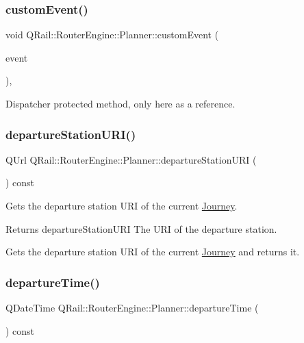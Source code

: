\subsubsection{\texorpdfstring{customEvent()}{customEvent()}}
{\footnotesize\ttfamily void Q\+Rail\+::\+Router\+Engine\+::\+Planner\+::custom\+Event (\begin{DoxyParamCaption}\item[{Q\+Event $\ast$}]{event }\end{DoxyParamCaption})\hspace{0.3cm}{\ttfamily [protected]}, {\ttfamily [virtual]}}



Dispatcher protected method, only here as a reference. 

\mbox{\label{classQRail_1_1RouterEngine_1_1Planner_a6cd264c862d10323717ca3b978797d2e}} 
\subsubsection{\texorpdfstring{departureStationURI()}{departureStationURI()}}
{\footnotesize\ttfamily Q\+Url Q\+Rail\+::\+Router\+Engine\+::\+Planner\+::departure\+Station\+U\+RI (\begin{DoxyParamCaption}{ }\end{DoxyParamCaption}) const}



Gets the departure station U\+RI of the current \mbox{\hyperlink{classQRail_1_1RouterEngine_1_1Journey}{Journey}}. 

\begin{DoxyReturn}{Returns}
departure\+Station\+U\+RI The U\+RI of the departure station.
\end{DoxyReturn}
Gets the departure station U\+RI of the current \mbox{\hyperlink{classQRail_1_1RouterEngine_1_1Journey}{Journey}} and returns it. \mbox{\label{classQRail_1_1RouterEngine_1_1Planner_af4816b0cc2e734bacb89d14c682ea7c5}} 
\subsubsection{\texorpdfstring{departureTime()}{departureTime()}}
{\footnotesize\ttfamily Q\+Date\+Time Q\+Rail\+::\+Router\+Engine\+::\+Planner\+::departure\+Time (\begin{DoxyParamCaption}{ }\end{DoxyParamCaption}) const}



